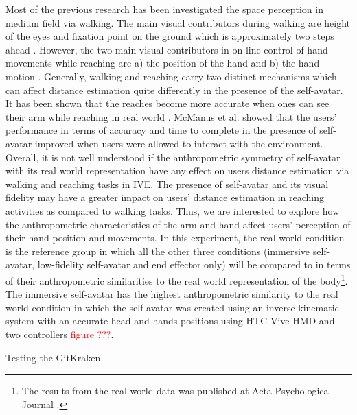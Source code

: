 Most of the previous research has been investigated the space perception in medium field via walking. The main visual contributors during walking are height of the eyes and fixation point on the ground which is approximately two steps ahead \cite{F15}. However, the two main visual contributors in on-line control of hand movements while reaching are a) the position of the hand and b) the hand motion \cite{SK04}. Generally, walking and reaching carry two distinct mechanisms which can affect distance estimation quite differently in the presence of the self-avatar. It has been shown that the reaches become more accurate when ones can see their arm while reaching in real world \cite{PBL+00,HHC+98}. McManus et al. \cite{MBS+11} showed that the users' performance in terms of accuracy and time to complete in the presence of self-avatar improved when users were allowed to interact with the environment. Overall, it is not well understood if the anthropometric symmetry of self-avatar with its real world representation have any effect on users distance estimation via walking and reaching tasks in IVE. The presence of self-avatar and its visual fidelity may have a greater impact on users' distance estimation in reaching activities as compared to walking tasks. Thus, we are interested to explore how the anthropometric characteristics of the arm and hand affect users' perception of their hand position and movements. In this experiment, the real world condition is the reference group in which all the other three conditions (immersive self-avatar, low-fidelity self-avatar and end effector only) will be compared to in terms of their anthropometric similarities  to the real world representation of the body\footnote{The results from the real world data was published at Acta Psychologica Journal \cite{DEH+17}.}. The immersive self-avatar has the highest anthropometric similarity to the real world condition in which the self-avatar was created using an inverse kinematic system with an accurate head and hands positions using HTC Vive HMD and two controllers \textcolor{red}{figure ???}.

Testing the GitKraken  






